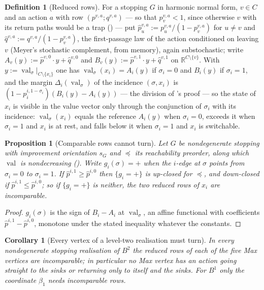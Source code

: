 \documentclass[11pt]{article}
\theoremstyle{plain}
\newtheorem{proposition}[theorem]{Proposition}
\newtheorem{corollary}[theorem]{Corollary}
\theoremstyle{definition}
\newtheorem{definition}[theorem]{Definition}
\DeclareMathOperator{\val}{val}
\begin{document}
\begin{definition}[Reduced rows]\label{def:reduced-rows}
For a stopping $G$ in harmonic normal form, $v\in C$ and an action $a$
with row $(p^{v,a};q^{v,a})$ --- so that $p^{v,a}_v<1$, since otherwise
$v$ with its return paths would be a trap () --- put
$\hat p^{v,a}_u:=p^{v,a}_u/(1-p^{v,a}_v)$ for $u\ne v$ and
$\hat q^{v,a}:=q^{v,a}/(1-p^{v,a}_v)$, the first-passage law of the action
conditioned on leaving $v$ (Meyer's stochastic complement, from memory),
again substochastic; write $A_v(y):=\hat p^{v,0}\cdot y+\hat q^{v,0}$ and
$B_v(y):=\hat p^{v,1}\cdot y+\hat q^{v,1}$ on $\mathbb R^{C\setminus\{v\}}$.
With $y:=\val_\sigma|_{C\setminus\{x_i\}}$ one has
$\val_\sigma(x_i)=A_i(y)$ if $\sigma_i=0$ and $B_i(y)$ if $\sigma_i=1$, and
the margin $\Delta_i(\val_\sigma)$ of the incidence $(\sigma,x_i)$ is
$(1-p^{i,1-\sigma_i}_i)(B_i(y)-A_i(y))$ --- the division of
's proof --- so the state of $x_i$ is visible in the
value vector only through the conjunction of $\sigma_i$ with its
incidence: $\val_\sigma(x_i)$ equals the reference $A_i(y)$ when
$\sigma_i=0$, exceeds it when $\sigma_i=1$ and $x_i$ is at rest, and
falls below it when $\sigma_i=1$ and $x_i$ is switchable.
\end{definition}

\begin{proposition}[Comparable rows cannot turn]\label{prop:rows-turn}
Let $G$ be nondegenerate stopping with improvement orientation $s_G$ and
$\preceq$ its reachability preorder, along which $\val$ is nondecreasing
(). Write $g_i(\sigma)=+$ when the $i$-edge at $\sigma$
points from $\sigma_i=0$ to $\sigma_i=1$. If $\hat p^{i,1}\ge\hat p^{i,0}$
then $\{g_i=+\}$ is up-closed for $\preceq$, and down-closed if
$\hat p^{i,1}\le\hat p^{i,0}$; so if $\{g_i=+\}$ is neither, the two
reduced rows of $x_i$ are incomparable.
\end{proposition}

\begin{proof}
$g_i(\sigma)$ is the sign of $B_i-A_i$ at $\val_\sigma$, an affine
functional with coefficients $\hat p^{i,1}-\hat p^{i,0}$, monotone under
the stated inequality whatever the constants.
\end{proof}

\begin{corollary}[Every vertex of a level-two realisation must turn]\label{cor:b2-rows}
In every nondegenerate stopping realisation of $B^{2}$ the reduced rows of
each of the five Max vertices are incomparable; in particular no Max
vertex has an action going straight to the sinks or returning only to
itself and the sinks. For $B^{1}$ only the coordinate $\beta_1$ needs
incomparable rows.
\end{corollary}
\end{document}
